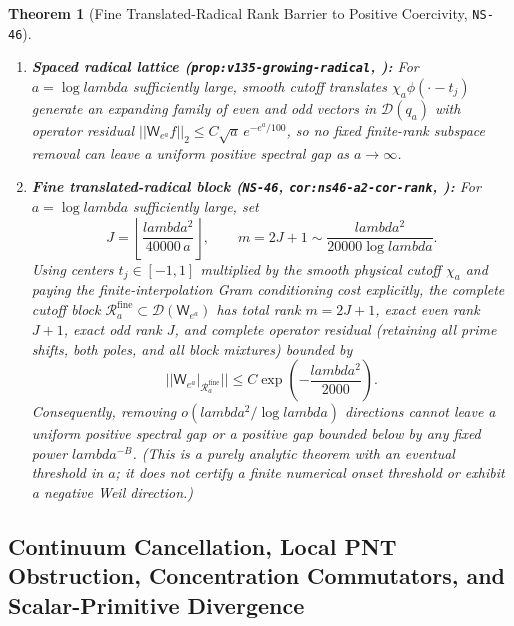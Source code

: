 \documentclass[11pt]{article}
\def\lambda{lambda}%
\def\norm#1{||#1||}%
\newtheorem{theorem}{Theorem}[section]
\theoremstyle{remark}
\newcommand{\norm}[1]{\left\lVert #1\right\rVert}
\begin{document}
\begin{theorem}[Fine Translated-Radical Rank Barrier to Positive Coercivity, \texttt{NS-46}]
\label{thm:rank-barrier}
\leavevmode
\begin{enumerate}[label=(\alph*)]
  \item \textbf{Spaced radical lattice (\texttt{prop:v135-growing-radical}, ):} For $a = \log\lambda$ sufficiently large, smooth cutoff translates $\chi_a\phi(\cdot - t_j)$ generate an expanding family of even and odd vectors in $\mathcal{D}(q_a)$ with operator residual $\norm{\mathsf{W}_{e^a}f}_2 \le C\sqrt{a}\,e^{-e^a/100}$, so no fixed finite-rank subspace removal can leave a uniform positive spectral gap as $a \to \infty$.
  \item \textbf{Fine translated-radical block (\texttt{NS-46}, \texttt{cor:ns46-a2-cor-rank}, ):} For $a = \log\lambda$ sufficiently large, set
  \begin{equation}
    J = \left\lfloor \frac{\lambda^2}{40000\,a} \right\rfloor, \qquad m = 2J + 1 \sim \frac{\lambda^2}{20000\log\lambda}.
  \end{equation}
  Using centers $t_j \in [-1,1]$ multiplied by the smooth physical cutoff $\chi_a$ and paying the finite-interpolation Gram conditioning cost explicitly, the complete cutoff block $\mathcal{R}_a^{\mathrm{fine}} \subset \mathcal{D}(\mathsf{W}_{e^a})$ has total rank $m = 2J + 1$, exact even rank $J + 1$, exact odd rank $J$, and complete operator residual (retaining all prime shifts, both poles, and all block mixtures) bounded by
  \begin{equation}
    \norm{\mathsf{W}_{e^a}\big|_{\mathcal{R}_a^{\mathrm{fine}}}} \le C\exp\!\left(-\frac{\lambda^2}{2000}\right).
  \end{equation}
  Consequently, removing $o(\lambda^2/\log\lambda)$ directions cannot leave a uniform positive spectral gap or a positive gap bounded below by any fixed power $\lambda^{-B}$. (This is a purely analytic theorem with an eventual threshold in $a$; it does not certify a finite numerical onset threshold or exhibit a negative Weil direction.)
\end{enumerate}
\end{theorem}

\subsection{Continuum Cancellation, Local PNT Obstruction, Concentration Commutators, and Scalar-Primitive Divergence}
\end{document}
